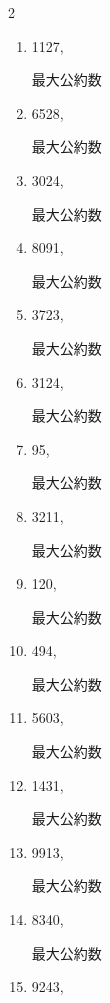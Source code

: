 \begin{multicols}{2}
\begin{enumerate}
\resetques

  \item 1127,

        最大公約数

  \item 6528,

        最大公約数

  \item 3024,

        最大公約数

  \item 8091,

        最大公約数

  \item 3723,

        最大公約数

\columnbreak %

  \item 3124,

        最大公約数

  \item 95,

        最大公約数

  \item 3211,

        最大公約数

  \item 120,

        最大公約数

  \item 494,

        最大公約数

\columnbreak %

\resetques

  \item 5603,

        最大公約数

  \item 1431,

        最大公約数

  \item 9913,

        最大公約数

  \item 8340,

        最大公約数

  \item 9243,


\end{enumerate}
\end{multicols}
